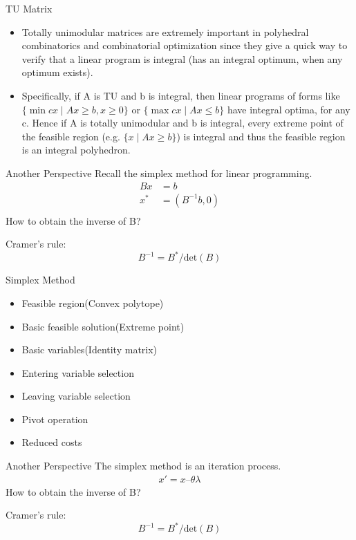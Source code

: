     \begin{frame}{TU Matrix}
      \begin{itemize}
        \item Totally unimodular matrices are extremely important in polyhedral combinatorics and combinatorial optimization since they give a quick way to verify that a linear program is integral (has an integral optimum, when any optimum exists).
        \item Specifically, if A is TU and b is integral, then linear programs of forms like $ \{\min cx\mid Ax\geq b,x\geq 0\} $ or $ \{\max cx\mid Ax\leq b\} $ have integral optima, for any c. Hence if A is totally unimodular and b is integral, every extreme point of the feasible region (e.g. $ \{x\mid Ax\geq b\} $) is integral and thus the feasible region is an integral polyhedron.
      \end{itemize}
    \end{frame}

    \begin{frame}{Another Perspective}
      Recall the simplex method for linear programming.
      \begin{equation*}
        \begin{align}
        Bx &= b \\
        x^* &= (B^{-1}b,0) \\
        \end{align}
      \end{equation*}
      How to obtain the inverse of B?

      Cramer's rule: \[B^{-1} = B^*/\text{det}(B)\]
    \end{frame}

    \begin{frame}{Simplex Method}
      \begin{itemize}
        \item Feasible region(Convex polytope)
        \item Basic feasible solution(Extreme point)
        \item Basic variables(Identity matrix)
        \item Entering variable selection
        \item Leaving variable selection
        \item Pivot operation
        \item Reduced costs
      \end{itemize}
    \end{frame}

    \begin{frame}{Another Perspective}
      The simplex method is an iteration process.
      \begin{equation*}
        \begin{align}
        x' = x – θλ
        \end{align}
      \end{equation*}
      How to obtain the inverse of B?

      Cramer's rule: \[B^{-1} = B^*/\text{det}(B)\]
    \end{frame}
